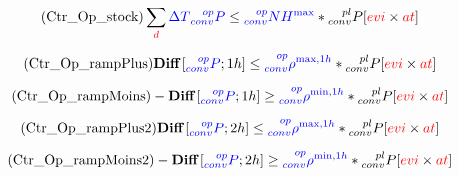 \documentclass{article}
\begin{document}
\begin{equation} \tag{Ctr\_Op\_stock}
   \sum_{\textcolor{red}{d}} \textcolor{blue}{\Delta T} \textcolor{blue}{ \prescript{op}{conv}{P}}  \leq  \textcolor{blue}{\prescript{op}{conv}{NH^{\max}}} *  \prescript{pl}{conv}{P} \hfill [\textcolor{red}{evi}  \times \textcolor{red}{at}]
\label{eq:Ctr_Op_stock}
\end{equation}

\begin{equation} \tag{Ctr\_Op\_rampPlus}
   \textbf{Diff} \left [  \textcolor{blue}{ \prescript{op}{conv}{P}} ; 1h \right ] \leq  \textcolor{blue}{\prescript{op}{conv}{\rho^{\max,1h}}} *  \prescript{pl}{conv}{P} \hfill [\textcolor{red}{evi}  \times \textcolor{red}{at}]
\label{eq:Ctr_Op_rampPlus}
\end{equation}

\begin{equation} \tag{Ctr\_Op\_rampMoins}
   -\textbf{Diff} \left [  \textcolor{blue}{ \prescript{op}{conv}{P}} ; 1h \right ]  \geq  \textcolor{blue}{\prescript{op}{conv}{\rho^{\min,1h}}} *  \prescript{pl}{conv}{P} \hfill [\textcolor{red}{evi}  \times \textcolor{red}{at}]
\label{eq:Ctr_Op_rampMoins}
\end{equation}

\begin{equation} \tag{Ctr\_Op\_rampPlus2}
   \textbf{Diff} \left [  \textcolor{blue}{ \prescript{op}{conv}{P}} ; 2h \right ] \leq  \textcolor{blue}{\prescript{op}{conv}{\rho^{\max,1h}}} *  \prescript{pl}{conv}{P} \hfill [\textcolor{red}{evi}  \times \textcolor{red}{at}]
\label{eq:Ctr_Op_rampPlus}
\end{equation}

\begin{equation} \tag{Ctr\_Op\_rampMoins2}
   -\textbf{Diff} \left [  \textcolor{blue}{ \prescript{op}{conv}{P}} ; 2h \right ]  \geq  \textcolor{blue}{\prescript{op}{conv}{\rho^{\min,1h}}} *  \prescript{pl}{conv}{P} \hfill [\textcolor{red}{evi}  \times \textcolor{red}{at}]
\label{eq:Ctr_Op_rampMoins}
\end{equation}



\newpage
\end{document}
